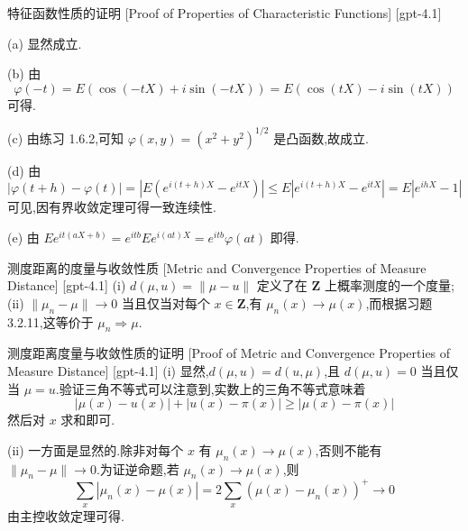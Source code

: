\documentclass[UTF8]{ctexart}
\begin{document}
    
    
    \begin{prf}
        {特征函数性质的证明}
        [Proof of Properties of Characteristic Functions]
        [gpt-4.1]
        
(a) 显然成立.

(b) 由
\[
\varphi(-t) = E ( \cos(-t X) + i \sin(-t X) ) = E ( \cos(t X) - i \sin(t X) )
\]
可得.

(c) 由练习 1.6.2,可知 $\varphi(x, y) = (x^{2} + y^{2})^{1/2}$ 是凸函数,故成立.

(d) 由
\[
| \varphi(t + h) - \varphi(t) | = | E ( e^{i (t + h) X} - e^{i t X} ) | \leq E | e^{i (t + h) X} - e^{i t X} | = E | e^{i h X} - 1 |
\]
可见,因有界收敛定理可得一致连续性.

(e) 由 $E e^{i t (a X + b)} = e^{i t b} E e^{i (a t) X} = e^{i t b} \varphi(a t)$ 即得.

    \end{prf}
    
    
    
    \begin{lma}
        {测度距离的度量与收敛性质}
        [Metric and Convergence Properties of Measure Distance]
        [gpt-4.1]
        (i) $d ( \mu , 
u ) = \| \mu - 
u \|$ 定义了在 $\mathbf{Z}$ 上概率测度的一个度量;(ii) $\| \mu_n - \mu \| \to 0$ 当且仅当对每个 $x \in \mathbf{Z}$,有 $\mu_n(x) \to \mu(x)$,而根据习题 3.2.11,这等价于 $\mu_n \Rightarrow \mu$.
    \end{lma}
    
    
    
    \begin{prf}
        {测度距离度量与收敛性质的证明}
        [Proof of Metric and Convergence Properties of Measure Distance]
        [gpt-4.1]
        (i) 显然,$d ( \mu , 
u ) = d ( 
u , \mu )$,且 $d ( \mu , 
u ) = 0$ 当且仅当 $\mu = 
u$.验证三角不等式可以注意到,实数上的三角不等式意味着
\[
| \mu ( x ) - 
u ( x ) | + | 
u ( x ) - \pi ( x ) | \geq | \mu ( x ) - \pi ( x ) |
\]
然后对 $x$ 求和即可.

(ii) 一方面是显然的.除非对每个 $x$ 有 $\mu_n(x) \to \mu(x)$,否则不能有 $\| \mu_n - \mu \| \to 0$.为证逆命题,若 $\mu_n(x) \to \mu(x)$,则
\[
\sum _ { x } | \mu_n ( x ) - \mu ( x ) | = 2 \sum _ { x } ( \mu ( x ) - \mu_n ( x ) ) ^ { + } \to 0
\]
由主控收敛定理可得.
    \end{prf}
    
\end{document}
